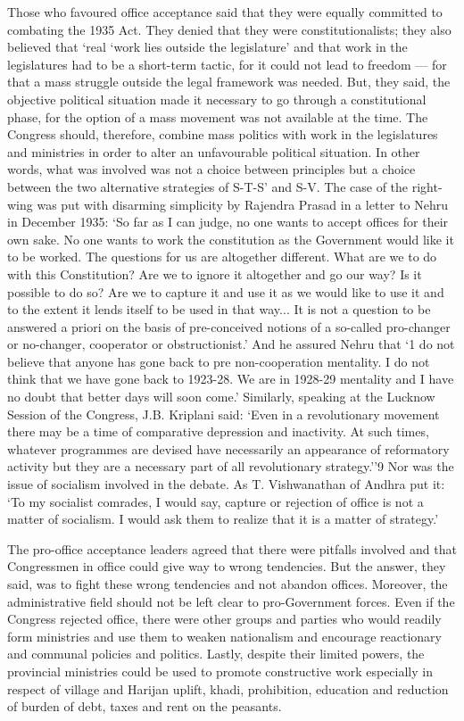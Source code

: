 Those who favoured office acceptance said that they were equally committed to combating the 1935 Act. They denied that they were constitutionalists; they also believed that `real `work lies outside the legislature' and that work in the legislatures had to be a short-term tactic, for it could not lead to freedom — for that a mass struggle outside the legal framework was needed. But, they said, the objective political situation made it necessary to go through a constitutional phase, for the option of a mass movement was not available at the time. The Congress should, therefore, combine mass politics with work in the legislatures and ministries in order to alter an unfavourable political situation. In other words, what was involved was not a choice between principles but a choice between the two alternative strategies of S-T-S' and S-V. The case of the right-wing was put with disarming simplicity by Rajendra Prasad in a letter to Nehru in December 1935: `So far as I can judge, no one wants to accept offices for their own sake. No one wants to work the constitution as the Government would like it to be worked. The questions for us are altogether different. What are we to do with this Constitution? Are we to ignore it altogether and go our way? Is it possible to do so? Are we to capture it and use it as we would like to use it and to the extent it lends itself to be used in that way... It is not a question to be answered a priori on the basis of pre-conceived notions of a so-called pro-changer or no-changer, cooperator or obstructionist.' And he assured Nehru that `1 do not believe that anyone has gone back to pre non-cooperation mentality. I do not think that we have gone back to 1923-28. We are in 1928-29 mentality and I have no doubt that better days will soon come.' Similarly, speaking at the Lucknow Session of the Congress, J.B. Kriplani said: `Even in a revolutionary movement there may be a time of comparative depression and inactivity. At such times, whatever programmes are devised have necessarily an appearance of reformatory activity but they are a necessary part of all revolutionary strategy.''9 Nor was the issue of socialism involved in the debate. As T. Vishwanathan of Andhra put it: `To my socialist comrades, I would say, capture or rejection of office is not a matter of socialism. I would ask them to realize that it is a matter of strategy.' 

The pro-office acceptance leaders agreed that there were pitfalls involved and that Congressmen in office could give way to wrong tendencies. But the answer, they said, was to fight these wrong tendencies and not abandon offices. Moreover, the administrative field should not be left clear to pro-Government forces. Even if the Congress rejected office, there were other groups and parties who would readily form ministries and use them to weaken nationalism and encourage reactionary and communal policies and politics. Lastly, despite their limited powers, the provincial ministries could be used to promote constructive work especially in respect of village and Harijan uplift, khadi, prohibition, education and reduction of burden of debt, taxes and rent on the peasants. 

